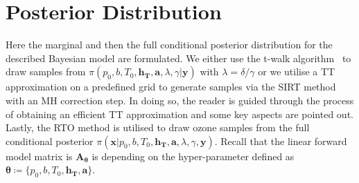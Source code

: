 \section{Posterior Distribution}
Here the marginal and then the full conditional posterior distribution for the described Bayesian model are formulated.
We either use the t-walk algorithm~\cite{christen2010general} to draw samples from $\pi(p_0,b,T_0,\bm{h_T},\bm{a} ,\lambda, \gamma| \bm{y})$ with $\lambda = \delta / \gamma$ or we utilise a TT approximation on a predefined grid to generate samples via the SIRT method with an MH correction step.
In doing so, the reader is guided through the process of obtaining an efficient TT approximation and some key aspects are pointed out.
Lastly, the RTO method is utilised to draw ozone samples from the full conditional posterior $\pi(\bm{x}|p_0,b,T_0,\bm{h_T},\bm{a} ,\lambda, \gamma, \bm{y})$.
Recall that the linear forward model matrix is $\bm{A}_{\bm{\theta}}$ is depending on the hyper-parameter defined as $\bm{\theta}  \coloneqq \{p_0,b,T_0,\bm{h_T},\bm{a}  \}$.
